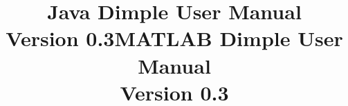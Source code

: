 \documentclass[11pt, oneside]{article}   	%
\title{\huge \bfseries Java Dimple User Manual \\ \normalfont \large Version 0.3}
\title{\huge \bfseries MATLAB Dimple User Manual \\ \normalfont \large Version 0.3}
\begin{document}
\maketitle


\clearpage
\setcounter{tocdepth}{5}				%
\tableofcontents

\clearpage







\begin{appendices}


\end{appendices}
\end{document}
